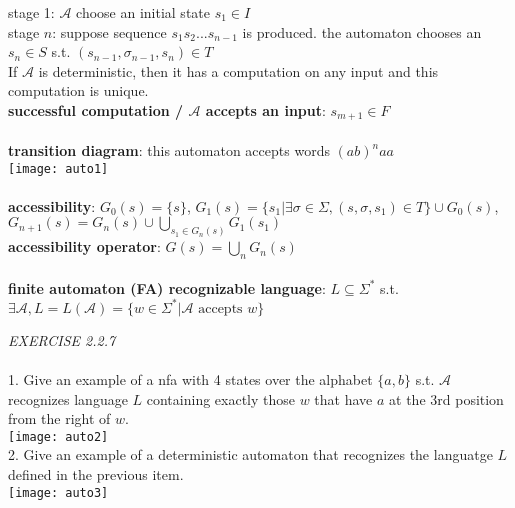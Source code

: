 \documentclass{article}
\begin{document}
\null\qquad stage 1: \(\mathcal{A}\) choose an initial state \(s_{1}\in I\)\\
\null\qquad stage \(n\): suppose sequence \(s_{1}s_{2}...s_{n-1}\) is produced. the automaton chooses an \(s_{n}\in S\) s.t. \((s_{n-1},\sigma_{n-1},s_{n})\in T\)\\
If \(\mathcal{A}\) is deterministic, then it has a computation on any input and this computation is unique.\\
\textbf{successful computation / \(\mathcal{A}\) accepts an input}: \(s_{m+1}\in F\)\\
\\
\textbf{transition diagram}: this automaton accepts words \((ab)^{n}aa\)\\
\texttt{[image: auto1]}\\
\\
\textbf{accessibility}: \(G_{0}(s)=\{s\}\), \(G_{1}(s)=\{s_{1}|\exists\sigma\in\Sigma, (s,\sigma,s_{1})\in T\}\cup G_{0}(s)\),\(G_{n+1}(s)=G_{n}(s)\cup\bigcup_{s_{1}\in G_{n}(s)}G_{1}(s_{1})\)\\
\textbf{accessibility operator}: \(G(s)=\bigcup_{n}G_{n}(s)\)\\
\\
\textbf{finite automaton (FA) recognizable language}: \(L\subseteq\Sigma^{*}\) s.t. \(\exists\mathcal{A},L=L(\mathcal{A})=\{w\in\Sigma^{*}|\mathcal{A} \text{ accepts }w\}\)\\
\begin{siderules}\color{blue}\textit{EXERCISE 2.2.7}\color{black}\\\\
\color{blue}1. Give an example of a nfa with 4 states over the alphabet \(\{a,b\}\) s.t. \(\mathcal{A}\) recognizes language \(L\) containing exactly those \(w\) that have \(a\) at the 3rd position from the right of \(w\).\\\color{black}
\texttt{[image: auto2]}\\
\color{blue}2. Give an example of a deterministic automaton that recognizes the languatge \(L\) defined in the previous item.\color{black}\\
\texttt{[image: auto3]}
\end{siderules}
\end{document}
